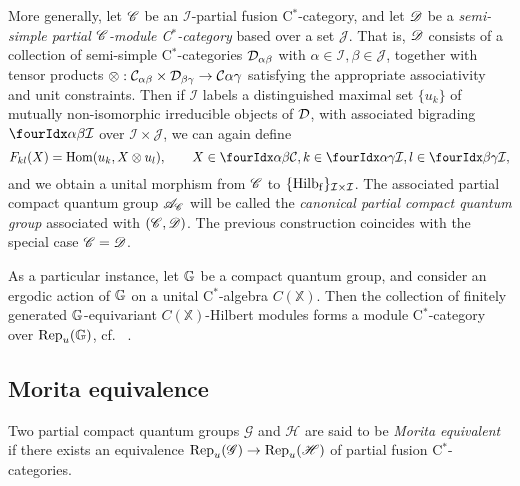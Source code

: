 \begin{Exa} More generally, let $\mathscr{C}$ be an $\mathscr{I}$-partial fusion C$^*$-category, and let $\mathscr{D}$ be a \emph{semi-simple partial $\mathscr{C}$-module C$^*$-category} based over a set $\mathscr{J}$. That is, $\mathscr{D}$ consists of a collection of semi-simple C$^*$-categories $\mathcal{D}_{\alpha\beta}$ with $\alpha\in \mathscr{I},\beta\in \mathscr{J}$, together with tensor products $\otimes: \mathcal{C}_{\alpha\beta}\times \mathcal{D}_{\beta\gamma}\rightarrow \mathcal{C}{\alpha\gamma}$ satisfying the appropriate associativity and unit constraints. Then if $\mathcal{I}$ labels a distinguished maximal set $\{u_k\}$ of mutually non-isomorphic irreducible objects of $\mathcal{D}$, with associated bigrading $\Gru{\mathcal{I}}{\alpha}{\beta}$ over $\mathscr{I}\times \mathscr{J}$, we can again define \[F_{kl}(X)  = \Hom(u_k,  X\otimes u_l),\qquad X\in \Gru{\CatC}{\alpha}{\beta}, k\in \Gru{\mathcal{I}}{\alpha}{\gamma},l\in \Gru{\mathcal{I}}{\beta}{\gamma},\] and we obtain a unital morphism from $\mathscr{C}$ to $\{\mathrm{Hilb}_{\operatorname{\mathrm{f}}}\}_{\mathcal{I}\times \mathcal{I}}$. The associated partial compact quantum group $\mathscr{A}_{\mathscr{C}}$ will be called the \emph{canonical partial compact quantum group} associated with $(\mathscr{C},\mathscr{D})$. The previous construction coincides with the special case $\mathscr{C}= \mathscr{D}$.
\end{Exa}

\begin{Exa}\label{ExaErgo} As a particular instance, let $\mathbb{G}$ be a compact quantum group, and consider an ergodic action of $\mathbb{G}$ on a unital C$^*$-algebra $C(\mathbb{X})$. Then the collection of finitely generated $\mathbb{G}$-equivariant $C(\mathbb{X})$-Hilbert modules forms a module C$^*$-category over $\mathrm{Rep}_u(\mathbb{G})$, cf.~ \cite{DCY1}. 
\end{Exa}

\subsection{Morita equivalence}


\begin{Def} Two partial compact quantum groups $\mathscr{G}$ and $\mathscr{H}$ are said to be \emph{Morita equivalent} if there exists an equivalence $\mathrm{Rep}_u(\mathscr{G}) \rightarrow \mathrm{Rep}_u(\mathscr{H})$ of partial fusion C$^*$-categories. %
\end{Def} 

